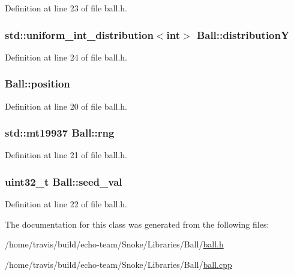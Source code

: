 Definition at line 23 of file ball.\-h.

\hypertarget{class_ball_a9a8e67dcc49382448848c497ff7ede25}{
\subsubsection[{distribution\-Y}]{\setlength{\rightskip}{0pt plus 5cm}std\-::uniform\-\_\-int\-\_\-distribution$<$int$>$ Ball\-::distribution\-Y\hspace{0.3cm}{\ttfamily [private]}}}\label{class_ball_a9a8e67dcc49382448848c497ff7ede25}


Definition at line 24 of file ball.\-h.

\hypertarget{class_ball_abd10a53eda37a2c541ad5dfbbea27f81}{
\subsubsection[{position}]{ Ball\-::position\hspace{0.3cm}{\ttfamily [private]}}}\label{class_ball_abd10a53eda37a2c541ad5dfbbea27f81}


Definition at line 20 of file ball.\-h.

\hypertarget{class_ball_ae3c68e21e0801b657b980380ab6a4bb2}{
\subsubsection[{rng}]{\setlength{\rightskip}{0pt plus 5cm}std\-::mt19937 Ball\-::rng\hspace{0.3cm}{\ttfamily [private]}}}\label{class_ball_ae3c68e21e0801b657b980380ab6a4bb2}


Definition at line 21 of file ball.\-h.

\hypertarget{class_ball_ad6e67b032167a7d9db9630bc5ab2e613}{
\subsubsection[{seed\-\_\-val}]{\setlength{\rightskip}{0pt plus 5cm}uint32\-\_\-t Ball\-::seed\-\_\-val\hspace{0.3cm}{\ttfamily [private]}}}\label{class_ball_ad6e67b032167a7d9db9630bc5ab2e613}


Definition at line 22 of file ball.\-h.



The documentation for this class was generated from the following files\-:\begin{DoxyCompactItemize}
\item 
/home/travis/build/echo-\/team/\-Snoke/\-Libraries/\-Ball/\hyperlink{ball_8h}{ball.\-h}\item 
/home/travis/build/echo-\/team/\-Snoke/\-Libraries/\-Ball/\hyperlink{ball_8cpp}{ball.\-cpp}\end{DoxyCompactItemize}
